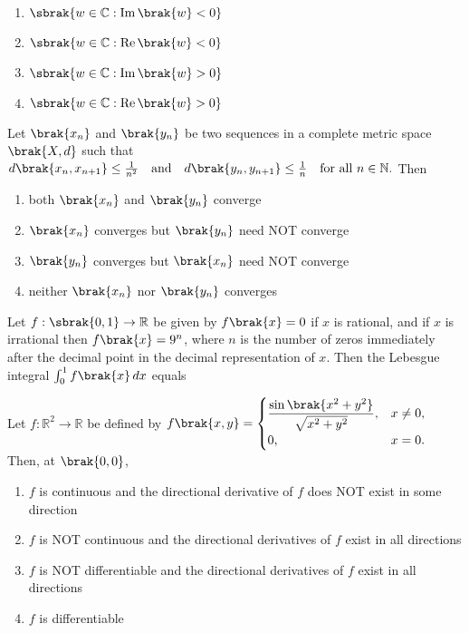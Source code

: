 \begin{enumerate}
    \item $\sbrak{w \in \mathbb{C} : \operatorname{Im} \brak{w} < 0}$
    \item $\sbrak{w \in \mathbb{C} : \operatorname{Re} \brak{w} < 0}$
    \item $\sbrak{w \in \mathbb{C} : \operatorname{Im} \brak{w} > 0}$
    \item $\sbrak{w \in \mathbb{C} : \operatorname{Re} \brak{w} > 0}$
\end{enumerate}

\item Let $\brak{x_n}$ and $\brak{y_n}$ be two sequences in a complete metric space $\brak{X, d}$ such that 
$d \brak{x_n, x_{n+1}} \leq \frac{1}{n^2} \quad \text{and} \quad d \brak{y_n, y_{n+1}} \leq \frac{1}{n} \quad \text{for all } n \in \mathbb{N}.$
Then

\begin{enumerate}
    \item both $\brak{x_n}$ and $\brak{y_n}$ converge
    \item $\brak{x_n}$ converges but $\brak{y_n}$ need NOT converge
    \item $\brak{y_n}$ converges but $\brak{x_n}$ need NOT converge
    \item neither $\brak{x_n}$ nor $\brak{y_n}$ converges
\end{enumerate}

\item Let $f: \sbrak{0, 1} \to \mathbb{R}$ be given by $f \brak{x} = 0$ if $x$ is rational, and if $x$ is irrational then $f \brak{x} = 9^n$, where $n$ is the number of zeros immediately after the decimal point in the decimal representation of $x$. Then the Lebesgue integral
$\int_0^1 f \brak{x} \, dx$
equals 

\item Let $f: \mathbb{R}^2 \to \mathbb{R}$ be defined by 
$f \brak{x, y} = \begin{cases}
\dfrac{\sin \brak{x^2 + y^2}}{\sqrt{x^2 + y^2}}, & x \neq 0, \\
0, & x = 0.
\end{cases}$
Then, at $\brak{0, 0}$,

\begin{enumerate}
    \item $f$ is continuous and the directional derivative of $f$ does NOT exist in some direction
    \item $f$ is NOT continuous and the directional derivatives of $f$ exist in all directions
    \item $f$ is NOT differentiable and the directional derivatives of $f$ exist in all directions
    \item $f$ is differentiable
\end{enumerate}


